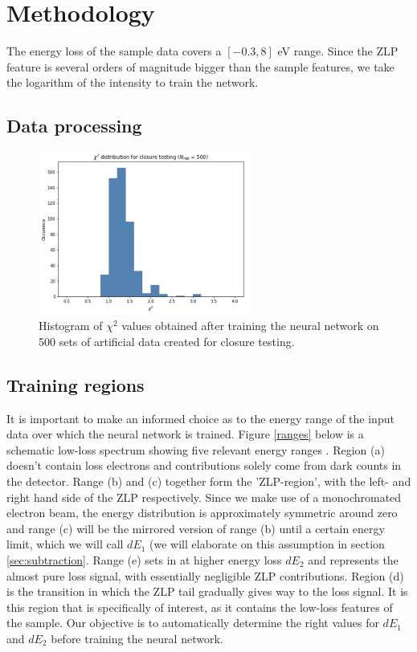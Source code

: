 \documentclass[11pt,a4paper]{article}
\numberwithin{equation}{section}
\numberwithin{figure}{section}
\numberwithin{table}{section}
\begin{document}
\section{Methodology}

The energy loss of the sample data covers a $[-0.3, 8]$ eV range. Since the ZLP feature is several orders of magnitude bigger than the sample features, we take the logarithm of the intensity to train the network. 
 
\subsection{Data processing}
\begin{figure}[H]
    \centering
    \includegraphics[width=70mm]{plots/closure.png}
    \caption{Histogram of $\chi^2$ values obtained after training the neural network on 500 sets of artificial data created for closure testing.}
    \label{closure2}
\end{figure}

\subsection{Training regions} \label{sec:regions}
It is important to make an informed choice as to the energy range of the input data over which the neural network is trained. Figure \ref{ranges} below is a schematic low-loss spectrum showing five relevant energy ranges \cite{Reed:2002}. Region (a) doesn't contain loss electrons and contributions solely come from dark counts in the detector. Range (b) and (c) together form the 'ZLP-region', with the left- and right hand side of the ZLP respectively. Since we make use of a monochromated electron beam, the energy distribution is approximately symmetric around zero and range (c) will be the mirrored version of range (b) until a certain energy limit, which we will call $dE_1$ (we will elaborate on this assumption in section \ref{sec:subtraction}. Range (e) sets in at higher energy loss $dE_2$ and represents the almost pure loss signal, with essentially negligible ZLP contributions. Region (d) is the transition in which the ZLP tail gradually gives way to the loss signal. It is this region that is specifically of interest, as it contains the low-loss features of the sample.  Our objective is to automatically determine the right values for $dE_1$ and $dE_2$ before training the neural network.
\end{document}
